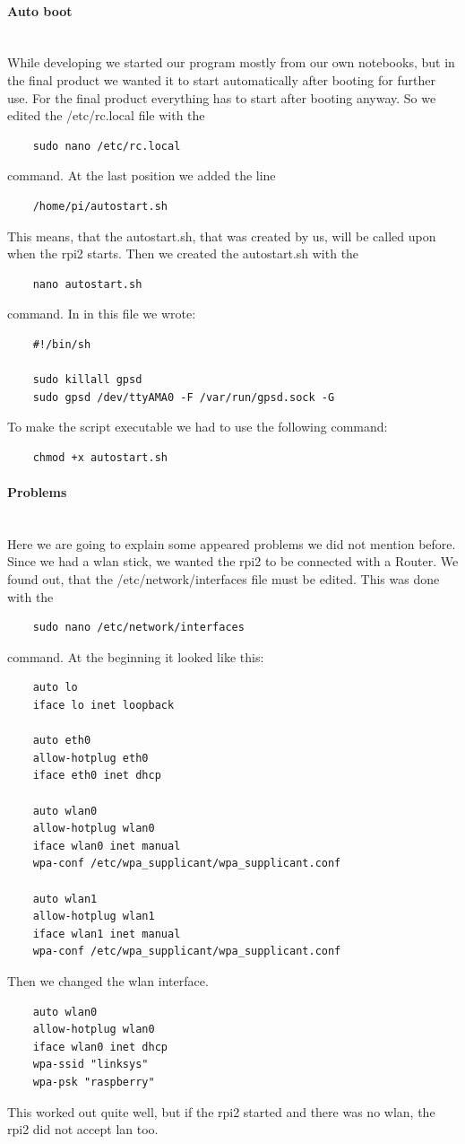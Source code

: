 \paragraph{Auto boot} \mbox{}\\
While developing we started our program mostly from our own notebooks, but in the final product we wanted it to start automatically after booting for further use. For the final product everything has to start after booting anyway. So we edited the /etc/rc.local file with the 
\begin{verbatim}
	sudo nano /etc/rc.local
\end{verbatim} 
command. At the last position we added the line
\begin{verbatim}
	/home/pi/autostart.sh 
\end{verbatim} 
This means, that the autostart.sh, that was created by us, will be called upon when the \gls{rpi2} starts. Then we created the autostart.sh with the 
\begin{verbatim}
	nano autostart.sh
\end{verbatim}
command. In in this file we wrote:
\begin{verbatim}
	#!/bin/sh

	sudo killall gpsd
	sudo gpsd /dev/ttyAMA0 -F /var/run/gpsd.sock -G
\end{verbatim}
To make the script executable we had to use the following command:
\begin{verbatim}
	chmod +x autostart.sh
\end{verbatim}
\paragraph{Problems} \mbox{}\\
Here we are going to explain some appeared problems we did not mention before.\newline
Since we had a \gls{wlan} stick, we wanted the \gls{rpi2} to be connected with a Router. We found out, that the /etc/network/interfaces file must be edited. This was done with the
\begin{verbatim}
	sudo nano /etc/network/interfaces 
\end{verbatim}
command.\newline
At the beginning it looked like this:
\begin{verbatim}
	auto lo
	iface lo inet loopback

	auto eth0
	allow-hotplug eth0
	iface eth0 inet dhcp

	auto wlan0
	allow-hotplug wlan0
	iface wlan0 inet manual
	wpa-conf /etc/wpa_supplicant/wpa_supplicant.conf

	auto wlan1
	allow-hotplug wlan1
	iface wlan1 inet manual
	wpa-conf /etc/wpa_supplicant/wpa_supplicant.conf
\end{verbatim}
Then we changed the \gls{wlan} interface.
\begin{verbatim}
	auto wlan0
	allow-hotplug wlan0
	iface wlan0 inet dhcp
	wpa-ssid "linksys"
	wpa-psk "raspberry"
\end{verbatim}
This worked out quite well, but if the \gls{rpi2} started and there was no \gls{wlan}, the \gls{rpi2} did not accept \gls{lan} too.
\newpage
